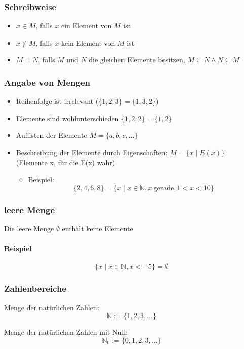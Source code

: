 \documentclass[a4paper]{scrartcl}
\theoremstyle{definition}
\theoremstyle{plain}
\theoremstyle{plain}
\theoremstyle{remark}
\theoremstyle{remark}
\theoremstyle{remark}
\theoremstyle{remark}
\theoremstyle{remark}
\begin{document}
\subsubsection{Schreibweise}
\label{sec-2-4-1}
\begin{itemize}
\item $x\in M$, falls $x$ ein Element von $M$ ist
\item $x\not\in M$, falls $x$ kein Element von $M$ ist
\item $M=N$, falls $M$ und $N$ die gleichen Elemente besitzen, $M\subseteq N \wedge N\subseteq M$
\end{itemize}

\subsubsection{Angabe von Mengen}
\label{sec-2-4-2}
\begin{itemize}
\item Reihenfolge ist irrelevant ($\{1,2,3\}=\{1,3,2\}$)
\item Elemente sind wohlunterschieden $\{1,2,2\} = \{1,2\}$
\item Auflisten der Elemente $M=\{a,b,c,\ldots\}$
\item Beschreibung der Elemente durch Eigenschaften: $M=\{x\mid E(x)\}$ \\
         (Elemente x, für die E(x) wahr)
\begin{itemize}
\item Beispiel:
\[\{2,4,6,8\} = \{x\mid x\in\mathbb{N}, x~\text{gerade}, 1 < x < 10\}\]
\end{itemize}
\end{itemize}
\subsubsection{leere Menge}
\label{sec-2-4-3}
Die leere Menge $\emptyset$ enthält keine Elemente
\paragraph{Beispiel}
\label{sec-2-4-3-1}
\[\{x\mid x\in\mathbb{N}, x < -5\} = \emptyset\]

\subsubsection{Zahlenbereiche}
\label{sec-2-4-4}
Menge der natürlichen Zahlen:
\[\mathbb{N} := \{1,2,3,\ldots\}\]

Menge der natürlichen Zahlen mit Null:
\[\mathbb{N}_0 := \{0, 1,2,3,\ldots\}\]
\end{document}

